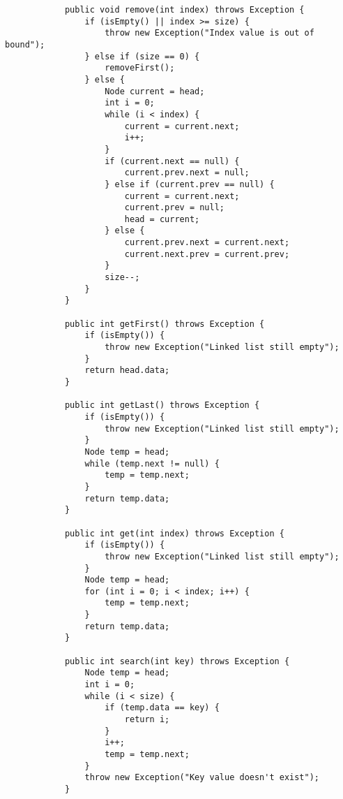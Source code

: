 \documentclass[12pt,titlepage]{article}
\begin{document}
\begin{enumerate}
\begin{verbatim}
            public void remove(int index) throws Exception {
                if (isEmpty() || index >= size) {
                    throw new Exception("Index value is out of bound");
                } else if (size == 0) {
                    removeFirst();
                } else {
                    Node current = head;
                    int i = 0;
                    while (i < index) {
                        current = current.next;
                        i++;
                    }
                    if (current.next == null) {
                        current.prev.next = null;
                    } else if (current.prev == null) {
                        current = current.next;
                        current.prev = null;
                        head = current;
                    } else {
                        current.prev.next = current.next;
                        current.next.prev = current.prev;
                    }
                    size--;
                }
            }

            public int getFirst() throws Exception {
                if (isEmpty()) {
                    throw new Exception("Linked list still empty");
                }
                return head.data;
            }

            public int getLast() throws Exception {
                if (isEmpty()) {
                    throw new Exception("Linked list still empty");
                }
                Node temp = head;
                while (temp.next != null) {
                    temp = temp.next;
                }
                return temp.data;
            }

            public int get(int index) throws Exception {
                if (isEmpty()) {
                    throw new Exception("Linked list still empty");
                }
                Node temp = head;
                for (int i = 0; i < index; i++) {
                    temp = temp.next;
                }
                return temp.data;
            }

            public int search(int key) throws Exception {
                Node temp = head;
                int i = 0;
                while (i < size) {
                    if (temp.data == key) {
                        return i;
                    }
                    i++;
                    temp = temp.next;
                }
                throw new Exception("Key value doesn't exist");
            }


\end{verbatim}
\end{enumerate}
\end{document}
